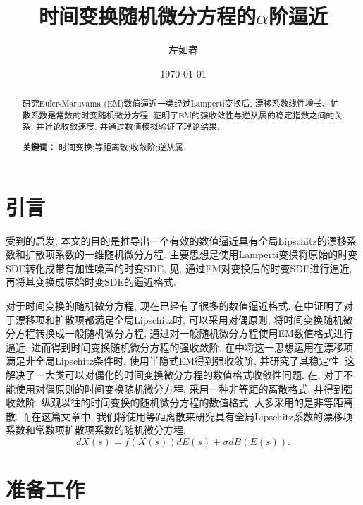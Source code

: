 \documentclass[12pt, final]{article}
\title{时间变换随机微分方程的$\alpha$阶逼近}
\author{左如春}
\date{\today}
\numberwithin{equation}{section}
\numberwithin{figure}{section}
\numberwithin{table}{section}
\theoremstyle{plain}
\theoremstyle{Definition}
\theoremstyle{Remark}
\begin{document}
	
	\maketitle
	
	\begin{abstract}
		研究Euler-Maruyama (EM)数值逼近一类经过Lamperti变换后, 漂移系数线性增长、扩散系数是常数的时变随机微分方程. 证明了EM的强收敛性与逆从属的稳定指数之间的关系, 并讨论收敛速度. 并通过数值模拟验证了理论结果. 
		
		\medskip
		\noindent\textbf{关键词：} 时间变换;等距离散;收敛阶;逆从属. 
	\end{abstract}
	
	\section{引言}
	
	受到\cite{Alfonsi2013602}的启发, 本文的目的是推导出一个有效的数值逼近具有全局Lipschitz的漂移系数和扩散项系数的一维随机微分方程. 主要思想是使用Lamperti变换将原始的时变SDE转化成带有加性噪声的时变SDE, 见\cite{iacus2008simulation}, 通过EM对变换后的时变SDE进行逼近, 再将其变换成原始时变SDE的逼近格式. 
	
	对于时间变换的随机微分方程, 现在已经有了很多的数值逼近格式. 在\cite{jum2014strong}中证明了对于漂移项和扩散项都满足全局Lipschitz时, 可以采用对偶原则, 将时间变换随机微分方程转换成一般随机微分方程, 通过对一般随机微分方程使用EM数值格式进行逼近, 进而得到时间变换随机微分方程的强收敛阶. 在\cite{deng2020semi}中将这一思想运用在漂移项满足非全局Lipschitz条件时, 使用半隐式EM得到强收敛阶, 并研究了其稳定性. 这解决了一大类可以对偶化的时间变换微分方程的数值格式收敛性问题. 在\cite{jin2019strong}, 对于不能使用对偶原则的时间变换随机微分方程, 采用一种非等距的离散格式, 并得到强收敛阶. 纵观以往的时间变换的随机微分方程的数值格式, 大多采用的是非等距离散. 而在这篇文章中, 我们将使用等距离散来研究具有全局Lipschitz系数的漂移项系数和常数项扩散项系数的随机微分方程:
	\begin{equation}\label{basic SDE}
		dX(s)=f(X(s))dE(s)+\sigma dB(E(s)). 
	\end{equation}
	
	\section{准备工作}
	
\end{document}
